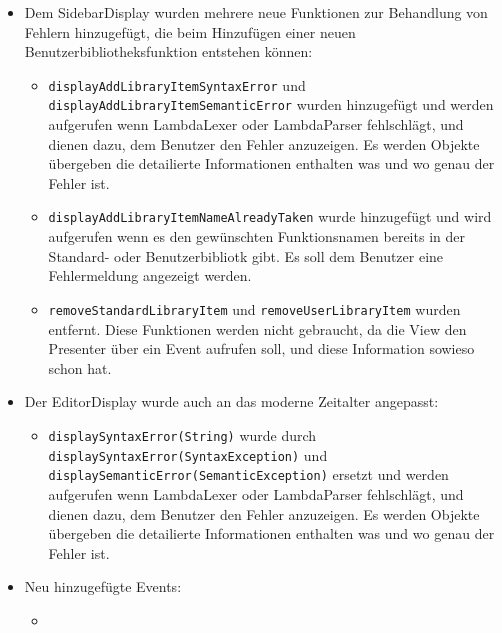 \documentclass[parskip=full,11pt,twoside]{scrartcl}
\begin{document}
\begin{itemize}
    \item Dem SidebarDisplay wurden mehrere neue Funktionen zur Behandlung von Fehlern hinzugefügt, die beim Hinzufügen einer neuen Benutzerbibliotheksfunktion entstehen können:
    	\begin{itemize}
        	\item \texttt{displayAddLibraryItemSyntaxError} und \newline
        	\texttt{displayAddLibraryItemSemanticError} wurden hinzugefügt und werden aufgerufen wenn LambdaLexer oder LambdaParser fehlschlägt, und dienen dazu, dem Benutzer den Fehler anzuzeigen. Es werden Objekte übergeben die detailierte Informationen enthalten was und wo genau der Fehler ist.
        	\item \texttt{displayAddLibraryItemNameAlreadyTaken} wurde hinzugefügt und wird aufgerufen wenn es den gewünschten Funktionsnamen bereits in der Standard- oder Benutzerbibliotk gibt. Es soll dem Benutzer eine Fehlermeldung angezeigt werden.
            \item \texttt{removeStandardLibraryItem} und \newline
            	\texttt{removeUserLibraryItem} wurden entfernt. Diese Funktionen werden nicht gebraucht, da die View den Presenter über ein Event aufrufen soll, und diese Information sowieso schon hat.
        \end{itemize}
    \item Der EditorDisplay wurde auch an das moderne Zeitalter angepasst:
    	\begin{itemize}
    		\item \texttt{displaySyntaxError(String)} wurde
            durch \newline \texttt{displaySyntaxError(SyntaxException)} und \newline
        	\texttt{displaySemanticError(SemanticException)} ersetzt und werden aufgerufen wenn LambdaLexer oder LambdaParser fehlschlägt, und dienen dazu, dem Benutzer den Fehler anzuzeigen. Es werden Objekte übergeben die detailierte Informationen enthalten was und wo genau der Fehler ist.
    	\end{itemize}

    \item Neu hinzugefügte Events:
    	\begin{itemize}
    		\item
    	\end{itemize}
\end{itemize}
\end{document}
